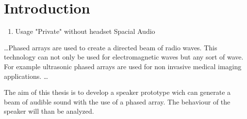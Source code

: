 \chapter{Introduction}

\begin{enumerate}
  \item Usage
  \subitem "Private" without headset
  \subitem Spacial Audio
\end{enumerate}

\dots Phased arrays are used to create a directed beam of radio waves. This technology can not only be used for electromagnetic waves but any sort of wave. For example ultrasonic phased arrays are used for non invasive medical imaging applications. \dots

The aim of this thesis is to develop a speaker prototype wich can generate a beam of audible sound with the use of a phased array. The behaviour of the speaker will than be analyzed.